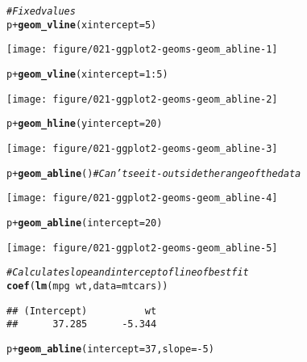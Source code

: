 \documentclass[a4paper,titlepage]{tufte-handout}\usepackage[]{graphicx}\usepackage[]{color}
\makeatletter
\def\maxwidth{ %
  \ifdim\Gin@nat@width>\linewidth
    \linewidth
  \else
    \Gin@nat@width
  \fi
}
\newcommand{\hlnum}[1]{\textcolor[rgb]{0.686,0.059,0.569}{#1}}%
\newcommand{\hlcom}[1]{\textcolor[rgb]{0.678,0.584,0.686}{\textit{#1}}}%
\newcommand{\hlopt}[1]{\textcolor[rgb]{0,0,0}{#1}}%
\newcommand{\hlstd}[1]{\textcolor[rgb]{0.345,0.345,0.345}{#1}}%
\newcommand{\hlkwc}[1]{\textcolor[rgb]{0.333,0.667,0.333}{#1}}%
\newcommand{\hlkwd}[1]{\textcolor[rgb]{0.737,0.353,0.396}{\textbf{#1}}}%
\newenvironment{kframe}{%
 \def\at@end@of@kframe{}%
 \ifinner\ifhmode%
  \def\at@end@of@kframe{\end{minipage}}%
  \begin{minipage}{\columnwidth}%
 \fi\fi%
 \def\FrameCommand##1{\hskip\@totalleftmargin \hskip-\fboxsep
 \colorbox{shadecolor}{##1}\hskip-\fboxsep
     \hskip-\linewidth \hskip-\@totalleftmargin \hskip\columnwidth}%
 \MakeFramed {\advance\hsize-\width
   \@totalleftmargin\z@ \linewidth\hsize
   \@setminipage}}%
 {\par\unskip\endMakeFramed%
 \at@end@of@kframe}
\newenvironment{knitrout}{}{} %
\makeatother
\begin{document}
\begin{knitrout}
\begin{kframe}
\begin{alltt}
\hlcom{# Fixed values}
\hlstd{p} \hlopt{+} \hlkwd{geom_vline}\hlstd{(}\hlkwc{xintercept} \hlstd{=} \hlnum{5}\hlstd{)}
\end{alltt}
\end{kframe}
\texttt{[image: figure/021-ggplot2-geoms-geom\_abline-1]} 
\begin{kframe}\begin{alltt}
\hlstd{p} \hlopt{+} \hlkwd{geom_vline}\hlstd{(}\hlkwc{xintercept} \hlstd{=} \hlnum{1}\hlopt{:}\hlnum{5}\hlstd{)}
\end{alltt}
\end{kframe}
\texttt{[image: figure/021-ggplot2-geoms-geom\_abline-2]} 
\begin{kframe}\begin{alltt}
\hlstd{p} \hlopt{+} \hlkwd{geom_hline}\hlstd{(}\hlkwc{yintercept} \hlstd{=} \hlnum{20}\hlstd{)}
\end{alltt}
\end{kframe}
\texttt{[image: figure/021-ggplot2-geoms-geom\_abline-3]} 
\begin{kframe}\begin{alltt}
\hlstd{p} \hlopt{+} \hlkwd{geom_abline}\hlstd{()} \hlcom{# Can't see it - outside the range of the data}
\end{alltt}
\end{kframe}
\texttt{[image: figure/021-ggplot2-geoms-geom\_abline-4]} 
\begin{kframe}\begin{alltt}
\hlstd{p} \hlopt{+} \hlkwd{geom_abline}\hlstd{(}\hlkwc{intercept} \hlstd{=} \hlnum{20}\hlstd{)}
\end{alltt}
\end{kframe}
\texttt{[image: figure/021-ggplot2-geoms-geom\_abline-5]} 
\begin{kframe}\begin{alltt}
\hlcom{# Calculate slope and intercept of line of best fit}
\hlkwd{coef}\hlstd{(}\hlkwd{lm}\hlstd{(mpg} \hlopt{~} \hlstd{wt,} \hlkwc{data} \hlstd{= mtcars))}
\end{alltt}
\begin{verbatim}
## (Intercept)          wt 
##      37.285      -5.344
\end{verbatim}
\begin{alltt}
\hlstd{p} \hlopt{+} \hlkwd{geom_abline}\hlstd{(}\hlkwc{intercept} \hlstd{=} \hlnum{37}\hlstd{,} \hlkwc{slope} \hlstd{=} \hlopt{-}\hlnum{5}\hlstd{)}
\end{alltt}
\end{kframe}

\end{knitrout}
\end{document}
